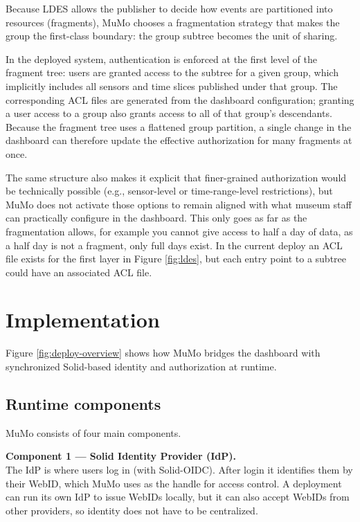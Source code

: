 Because LDES allows the publisher to decide how events are partitioned
into resources (fragments), MuMo chooses a fragmentation strategy that
makes the group the first-class boundary: the group subtree becomes the
unit of sharing.

In the deployed system, authentication is enforced at the first level of
the fragment tree: users are granted access to the subtree for a given
group, which implicitly includes all sensors and time slices published
under that group. The corresponding ACL files are generated from the
dashboard configuration; granting a user access to a group also grants
access to all of that group's descendants. Because the fragment tree
uses a flattened group partition, a single change in the dashboard can
therefore update the effective authorization for many fragments at once.

The same structure also makes it explicit that finer-grained
authorization would be technically possible (e.g., sensor-level or
time-range-level restrictions), but MuMo does not activate those options
to remain aligned with what museum staff can practically configure in
the dashboard. This only goes as far as the fragmentation allows, for
example you cannot give access to half a day of data, as a half day is
not a fragment, only full days exist. In the current deploy an ACL file
exists for the first layer in Figure \ref{fig:ldes}, but each entry
point to a subtree could have an associated ACL file.

\section{Implementation}\label{sec:implementation}

Figure \ref{fig:deploy-overview} shows how MuMo bridges the dashboard
with synchronized Solid-based identity and authorization at runtime.

\subsection{Runtime components}\label{runtime-components}

MuMo consists of four main components.

\textbf{Component 1 --- Solid Identity Provider (IdP).}\\
The IdP is where users log in (with Solid-OIDC). After login it
identifies them by their WebID, which MuMo uses as the handle for access
control. A deployment can run its own IdP to issue WebIDs locally, but
it can also accept WebIDs from other providers, so identity does not
have to be centralized.

